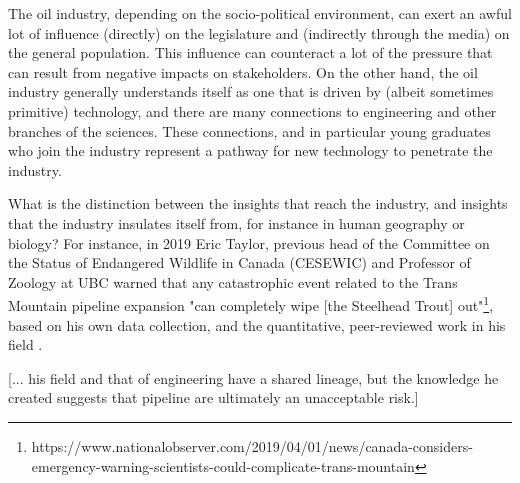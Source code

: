 \documentclass[12pt, man, natbib]{apa6}
\begin{document}
	The oil industry, depending on the socio-political environment, can exert an awful lot of influence (directly) on the legislature and (indirectly through the media) on the general population. This influence can counteract a lot of the pressure that can result from negative impacts on stakeholders. On the other hand, the oil industry generally understands itself as one that is driven by (albeit sometimes primitive) technology, and there are many connections to engineering and other branches of the sciences. These connections, and in particular young graduates who join the industry represent a pathway for new technology to penetrate the industry.
	
	What is the distinction between the insights that reach the industry, and insights that the industry insulates itself from, for instance in human geography or biology? For instance, in 2019 Eric Taylor, previous head of the Committee on the Status of Endangered Wildlife in Canada (CESEWIC) and Professor of Zoology at UBC warned that any catastrophic event related to the Trans Mountain pipeline expansion "can completely wipe [the Steelhead Trout] out"\footnote{https://www.nationalobserver.com/2019/04/01/news/canada-considers-emergency-warning-scientists-could-complicate-trans-mountain}, based on his own data collection, and the quantitative, peer-reviewed work in his field \citep{Neilson2018}. 
	
	[... his field and that of engineering have a shared lineage, but the knowledge he created suggests that pipeline are ultimately an unacceptable risk.]


\end{document}

